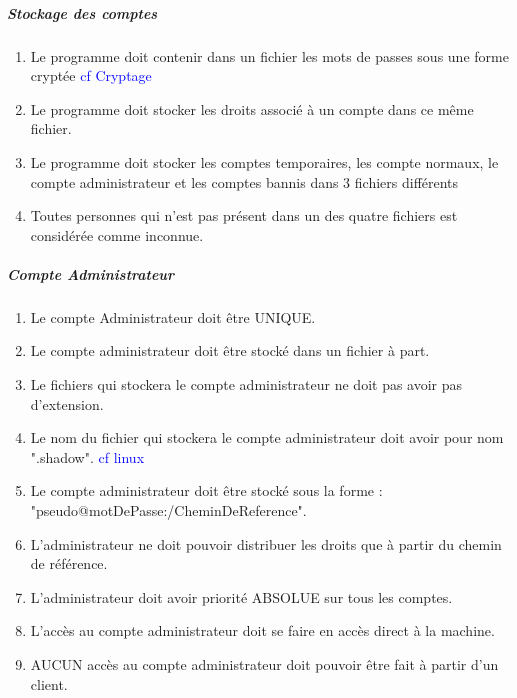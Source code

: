 \documentclass[10pt,a4paper]{report}
\begin{document}
	\subparagraph{Stockage des comptes}
		\begin{enumerate}
			\item Le programme doit contenir dans un fichier les mots de passes sous une forme cryptée \textcolor{blue}{cf Cryptage}
			\item Le programme doit stocker les droits associé à un compte dans ce même fichier.
			\item Le programme doit stocker les comptes temporaires, les compte normaux, le compte administrateur et les comptes bannis dans 3 fichiers différents
			\item Toutes personnes qui n'est pas présent dans un des quatre fichiers est considérée comme inconnue.
		\end{enumerate}

		
	\subparagraph{Compte Administrateur}
		\begin{enumerate}
			\item Le compte Administrateur doit être UNIQUE.
			\item Le compte administrateur doit être stocké dans un fichier à part.
			\item Le fichiers qui stockera le compte administrateur ne doit pas avoir pas d'extension.
			\item Le nom du fichier qui stockera le compte administrateur doit avoir pour nom ".shadow". \textcolor{blue}{cf linux}
			\item Le compte administrateur doit être stocké sous la forme : "pseudo@motDePasse:/CheminDeReference".
			\item L'administrateur ne doit pouvoir distribuer les droits que à partir du chemin de référence.
			\item L'administrateur doit avoir priorité ABSOLUE sur tous les comptes.
			\item L'accès au compte administrateur doit se faire en accès direct à la machine. 
			\item AUCUN accès au compte administrateur doit pouvoir être fait à partir d'un client.
		\end{enumerate}
		
\end{document}
